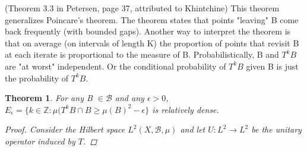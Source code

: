\documentclass{article}
\newtheorem{Thm}{Theorem}
\begin{document}
\noindent(Theorem 3.3 in Petersen, page 37, attributed to Khintchine) This theorem generalizes Poincare's theorem. The theorem states that points "leaving" B come back frequently (with bounded gaps). Another way to interpret the theorem is that on average (on intervals of length K) the proportion of points that revisit B at each iterate is proportional to the measure of B. Probabilistically, B and $T^kB$ are "at worst" independent. Or the conditional probability of $T^kB$ given B is just the probability of $T^kB$.
\begin{Thm}
For any B $\in \mathscr{B}$ and any $\epsilon > 0$, $E_\epsilon = \{k\in\mathbb{Z}:\mu(T^kB\cap B \geq \mu(B)^2 - \epsilon\}$ is relatively dense.
\begin{proof}
Consider the Hilbert space $L^2(X,\mathscr{B},\mu)$ and let $U: L^2 \rightarrow L^2$ be the unitary operator induced by $T$.
\end{proof}
\end{Thm}
\end{document}
